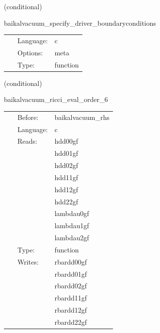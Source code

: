 \vspace{5mm}

   (conditional) 

\hspace{5mm} baikalvacuum\_specify\_driver\_boundaryconditions 

\hspace{5mm}{\it register boundary conditions in presync bin driver\_boundaryselect. } 


\hspace{5mm}

 \begin{tabular*}{160mm}{cll} 
~ & Language:  & c \\ 
~ & Options:  & meta \\ 
~ & Type:  & function \\ 
\end{tabular*} 


\vspace{5mm}

   (conditional) 

\hspace{5mm} baikalvacuum\_ricci\_eval\_order\_6 

\hspace{5mm}{\it compute ricci tensor, needed for bssn rhss, at finite-differencing order 6 } 


\hspace{5mm}

 \begin{tabular*}{160mm}{cll} 
~ & Before:  & baikalvacuum\_rhs \\ 
~ & Language:  & c \\ 
~ & Reads:  & hdd00gf \\ 
~& ~ &hdd01gf\\ 
~& ~ &hdd02gf\\ 
~& ~ &hdd11gf\\ 
~& ~ &hdd12gf\\ 
~& ~ &hdd22gf\\ 
~& ~ &lambdau0gf\\ 
~& ~ &lambdau1gf\\ 
~& ~ &lambdau2gf\\ 
~ & Type:  & function \\ 
~ & Writes:  & rbardd00gf \\ 
~& ~ &rbardd01gf\\ 
~& ~ &rbardd02gf\\ 
~& ~ &rbardd11gf\\ 
~& ~ &rbardd12gf\\ 
~& ~ &rbardd22gf\\ 
\end{tabular*} 


